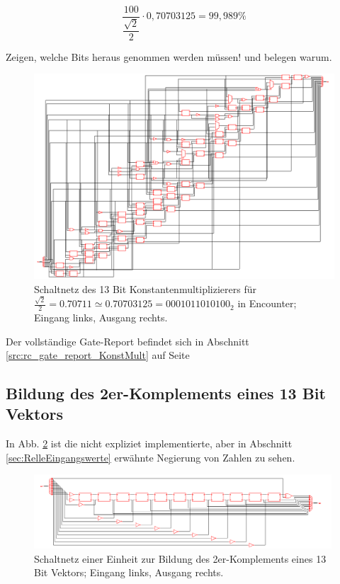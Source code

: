\begin{equation}\label{eq:abweichungWurzel2halbe}
 \frac{100}{\dfrac{\sqrt{2}}{2}}\cdot 0,70703125 = 99,989\%
\end{equation}

Zeigen, welche Bits heraus genommen werden müssen! und belegen warum.

\begin{figure}[!ht]
\centering  
  \includegraphics[width=1\textwidth]{img/13Bit_Konstantenmultiplizierer_neu.png}
  \caption{Schaltnetz des 13 Bit Konstantenmultiplizierers für $\frac{\sqrt{2}}{2} = 0.70711 \simeq 0.70703125 = 0001011010100_2$ in Encounter; Eingang links, Ausgang rechts.}
  \label{pic:Konstantenmultiplizierer}
\end{figure}

Der vollständige Gate-Report befindet sich in Abschnitt \ref{src:rc_gate_report_KonstMult} auf Seite \pageref{src:rc_gate_report_KonstMult}



\subsection{Bildung des 2er-Komplements eines 13 Bit Vektors}


In Abb. \ref{pic:13BitInverter} ist die nicht expliziet implementierte, aber in Abschnitt \ref{sec:RelleEingangswerte} erwähnte Negierung von Zahlen zu sehen.

\begin{figure}[htpb]
\centering
\includegraphics[width=0.99\textwidth]{img/13Bit_Negierer.png}
\caption{Schaltnetz einer Einheit zur Bildung des 2er-Komplements eines 13 Bit Vektors; Eingang links, Ausgang rechts.}
\label{pic:13BitInverter}
\end{figure}


